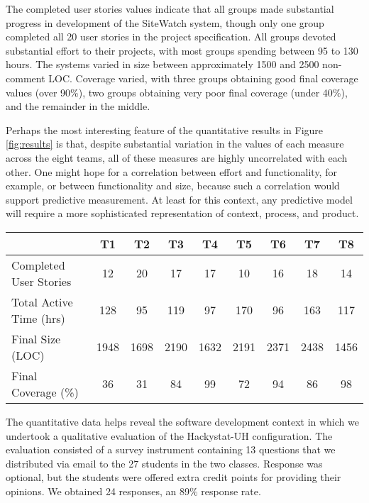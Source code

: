 \documentclass[10pt,twocolumn]{article}
\begin{document}
The completed user stories values indicate that all groups made substantial
progress in development of the SiteWatch system, though only one group
completed all 20 user stories in the project specification. All groups
devoted substantial effort to their projects, with most groups spending
between 95 to 130 hours. The systems varied in size between approximately
1500 and 2500 non-comment LOC. Coverage varied, with three groups obtaining
good final coverage values (over 90\%), two groups obtaining very poor
final coverage (under 40\%), and the remainder in the middle.

Perhaps the most interesting feature of the quantitative results in Figure
\ref{fig:results} is that, despite substantial variation in the values of
each measure across the eight teams, all of these measures are highly
uncorrelated with each other.  One might hope for a correlation between
effort and functionality, for example, or between functionality and size,
because such a correlation would support predictive measurement. At least
for this context, any predictive model will require a more sophisticated
representation of context, process, and product.

\begin{figure*}[ht]
\small
\centering
\begin{tabular}{|l|c|c|c|c|c|c|c|c|} \hline
                             & T1  &  T2 &  T3 &  T4 &  T5 &  T6 &  T7 &  T8 \\ \hline
Completed User Stories       & 12  &  20 &  17 &  17 &  10 &  16 &  18 &  14 \\
Total Active Time (hrs)      & 128 & 95  & 119 &  97 & 170 & 96  & 163 & 117 \\
Final Size (LOC)             & 1948 & 1698 & 2190 & 1632 & 2191 & 2371 & 2438 & 1456 \\
Final Coverage (\%)          & 36  & 31  & 84  &  99 & 72  & 94  & 86  & 98 \\ \hline
\end{tabular}
\caption{Selected quantitative results}
\label{fig:results}
\normalsize
\end{figure*}


The quantitative data helps reveal the software development context in which
we undertook a qualitative evaluation of the Hackystat-UH configuration. The evaluation
consisted of a survey instrument containing 13 questions that we
distributed via email to the 27 students in the two classes.  Response was
optional, but the students were offered extra credit points for providing
their opinions.   We obtained 24 responses, an 89\% response rate.
\end{document}
